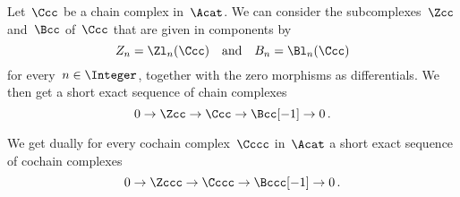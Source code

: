 \begin{remark}
  Let~$\Ccc$ be a chain complex in~$\Acat$.
  We can consider the subcomplexes~$\Zcc$ and~$\Bcc$ of~$\Ccc$ that are given in components by
  \[
      Z_n
    = \Zl_n(\Ccc)
    \quad\text{and}\quad
      B_n
    = \Bl_n(\Ccc)
  \]
  for every~$n \in \Integer$, together with the zero morphisms as differentials.
  We then get a short exact sequence of chain complexes
  \[
    0
    \to
    \Zcc
    \to
    \Ccc
    \to
    \Bcc[-1]
    \to
    0 \,.
  \]
  
  We get dually for every cochain complex~$\Cccc$ in~$\Acat$ a short exact sequence of cochain complexes
  \[
    0
    \to
    \Zccc
    \to
    \Cccc
    \to
    \Bccc[-1]
    \to
    0 \,.
  \]

\end{remark}









